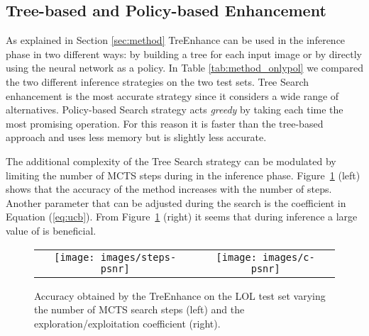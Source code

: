 \documentclass[3p,twocolumn]{elsarticle}
\newcommand{\method}[0]{TreEnhance}
\begin{document}
\subsection{Tree-based and Policy-based Enhancement}
As explained in Section \ref{sec:method} \method{} can be used in the inference phase in two different ways: by building a tree for each input image or by directly using the neural network as a policy. In Table \ref{tab:method_onlypol} we compared the two different inference strategies on the two test sets. Tree Search enhancement is the most accurate strategy since it considers a wide range of alternatives.   Policy-based Search strategy acts \emph{greedy} by taking each time the most promising operation. For this reason it is faster than the tree-based approach and uses less memory but is slightly less accurate.
\begin{table}
    \caption{Comparison of \method{} inference strategies on the two dataset considered.}
    \centering
    \label{tab:method_onlypol}
\end{table}

The additional complexity of the Tree Search strategy can be modulated by limiting the number of MCTS steps during in the inference phase.  Figure~\ref{fig:inference-plots} (left) shows that the accuracy of the method increases with the number of steps.  Another parameter that can be adjusted during the search is the coefficient  in Equation (\ref{eq:ucb}).  From Figure~\ref{fig:inference-plots} (right) it seems that during inference a large value of  is beneficial.
\begin{figure}
    \centering
    \begin{tabular}{cc}
    \texttt{[image: images/steps-psnr]} &
    \texttt{[image: images/c-psnr]} \\
\end{tabular}
    \caption{Accuracy obtained by the \method{} on the LOL test set varying the number of MCTS search steps (left) and the exploration/exploitation coefficient (right).}
    \label{fig:inference-plots}
\end{figure}
\end{document}
